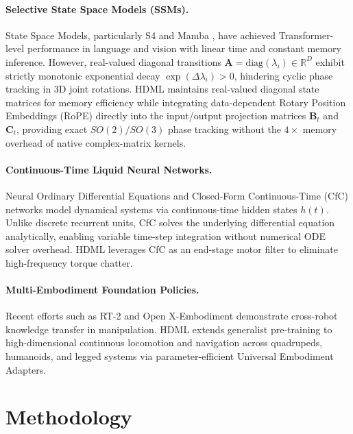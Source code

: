 \documentclass{article}
\begin{document}
\paragraph{Selective State Space Models (SSMs).} 
State Space Models, particularly S4 and Mamba \cite{gu2023mamba}, have achieved Transformer-level performance in language and vision with linear time and constant memory inference. However, real-valued diagonal transitions $\mathbf{A} = \text{diag}(\lambda_i) \in \mathbb{R}^D$ exhibit strictly monotonic exponential decay $\exp(\Delta \lambda_i) > 0$, hindering cyclic phase tracking in 3D joint rotations. HDML maintains real-valued diagonal state matrices for memory efficiency while integrating data-dependent Rotary Position Embeddings (RoPE) \cite{su2024roformer} directly into the input/output projection matrices $\mathbf{B}_t$ and $\mathbf{C}_t$, providing exact $SO(2)/SO(3)$ phase tracking without the $4\times$ memory overhead of native complex-matrix kernels.

\paragraph{Continuous-Time Liquid Neural Networks.}
Neural Ordinary Differential Equations and Closed-Form Continuous-Time (CfC) networks \cite{hasani2022closed, lechner2020neural} model dynamical systems via continuous-time hidden states $h(t)$. Unlike discrete recurrent units, CfC solves the underlying differential equation analytically, enabling variable time-step integration without numerical ODE solver overhead. HDML leverages CfC as an end-stage motor filter to eliminate high-frequency torque chatter.

\paragraph{Multi-Embodiment Foundation Policies.}
Recent efforts such as RT-2 \cite{brohan2023rt2} and Open X-Embodiment \cite{open_x_embodiment2023} demonstrate cross-robot knowledge transfer in manipulation. HDML extends generalist pre-training to high-dimensional continuous locomotion and navigation across quadrupeds, humanoids, and legged systems via parameter-efficient Universal Embodiment Adapters.

\section{Methodology}
\label{sec:method}
\end{document}
